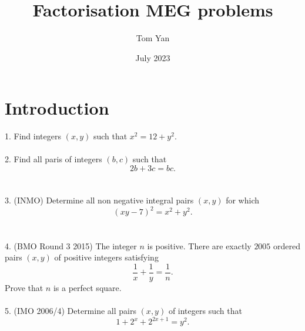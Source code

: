 \documentclass{article}
\title{Factorisation MEG problems}
\author{Tom Yan}
\date{July 2023}
\begin{document}
\maketitle

\section{Introduction}
1. Find integers $(x,y)$ such that $x^2=12+y^2$. \\\\
2. Find all paris of integers $(b, c)$ such that $$2b+3c=bc.$$\\\\
3. (INMO) Determine all non negative integral pairs $(x,y)$ for which $$(xy-7)^2=x^2+y^2.$$ \\\\
4. (BMO Round 3 2015) The integer $n$ is positive. There are exactly $2005$ ordered pairs $(x, y)$ of positive integers satisfying $$\frac{1}{x} + \frac{1}{y} = \frac{1}{n}.$$ Prove that $n$ is a perfect square. \\\\
5. (IMO 2006/4) Determine all pairs $(x, y)$ of integers such that\[1+2^{x}+2^{2x+1}= y^{2}.\]\\\\
\end{document}
